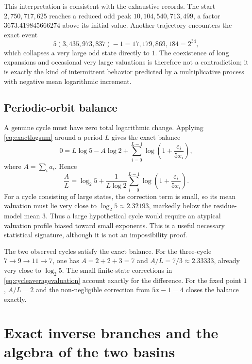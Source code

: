 \documentclass[11pt]{article}
\begin{document}
This interpretation is consistent with the exhaustive records.  The start $2{,}750{,}717{,}625$ reaches a reduced odd peak $10{,}104{,}540{,}713{,}499$, a factor $3673.419845666274$ above its initial value.  Another trajectory encounters the exact event
\[
5(3{,}435{,}973{,}837)-1
=17{,}179{,}869{,}184
=2^{34},
\]
which collapses a very large odd state directly to $1$.  The coexistence of long expansions and occasional very large valuations is therefore not a contradiction; it is exactly the kind of intermittent behavior predicted by a multiplicative process with negative mean logarithmic increment.

\subsection{Periodic-orbit balance}

A genuine cycle must have zero total logarithmic change.  Applying \eqref{eq:exactlogsum} around a period $L$ gives the exact balance
\begin{equation}
0=L\log5-A\log2+
\sum_{i=0}^{L-1}
\log\left(1+\frac{\varepsilon_i}{5x_i}\right),
\label{eq:cyclelogbalance}
\end{equation}
where $A=\sum_i a_i$.  Hence
\begin{equation}
\frac{A}{L}
=
\log_2 5+
\frac{1}{L\log2}
\sum_{i=0}^{L-1}
\log\left(1+\frac{\varepsilon_i}{5x_i}\right).
\label{eq:cycleaveragevaluation}
\end{equation}
For a cycle consisting of large states, the correction term is small, so its mean valuation must lie very close to $\log_2 5\approx2.32193$, markedly below the residue-model mean $3$.  Thus a large hypothetical cycle would require an atypical valuation profile biased toward small exponents.  This is a useful necessary statistical signature, although it is not an impossibility proof.

The two observed cycles satisfy the exact balance.  For the three-cycle $7\to9\to11\to7$, one has $A=2+2+3=7$ and $A/L=7/3\approx2.33333$, already very close to $\log_2 5$.  The small finite-state corrections in \eqref{eq:cycleaveragevaluation} account exactly for the difference.  For the fixed point $1$, $A/L=2$ and the non-negligible correction from $5x-1=4$ closes the balance exactly.

\section{Exact inverse branches and the algebra of the two basins}
\end{document}
